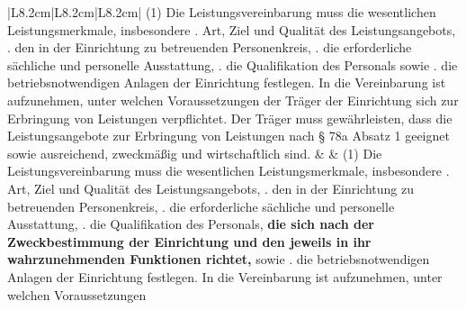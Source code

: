 \documentclass[10pt,a4paper,landscape]{article}
\begin{document}
\begin{longtable}{|L{8.2cm}|L{8.2cm}|L{8.2cm}|}
(1) Die Leistungsvereinbarung muss die  \newline wesentlichen Leistungsmerkmale,  \newline insbesondere   .   Art, Ziel und Qualität des  \newline Leistungsangebots,   . den in der Einrichtung zu betreuenden  \newline Personenkreis,   . die erforderliche sächliche und  \newline personelle Ausstattung,   . die Qualifikation des \textcolor{diffred}{Personals} sowie   . die betriebsnotwendigen Anlagen der  \newline Einrichtung   \newline festlegen. In die Vereinbarung ist  \newline aufzunehmen, unter welchen  \newline Voraussetzungen der Träger der  \newline Einrichtung sich zur Erbringung von  \newline Leistungen verpflichtet. Der Träger muss  \newline gewährleisten, dass die Leistungsangebote  \newline zur Erbringung von Leistungen nach \S{} 78a  \newline Absatz 1 geeignet sowie ausreichend,  \newline zweckmäßig und wirtschaftlich sind. &  & (1) Die Leistungsvereinbarung muss die  \newline wesentlichen Leistungsmerkmale,  \newline insbesondere   .   Art, Ziel und Qualität des  \newline Leistungsangebots,   . den in der Einrichtung zu betreuenden  \newline Personenkreis,   . die erforderliche sächliche und  \newline personelle Ausstattung,   . die Qualifikation des \textcolor{diffgreen}{Personals, }\textbf{\textcolor{diffgreen}{die sich  \newline nach der Zweckbestimmung der  \newline Einrichtung und den jeweils in ihr  \newline wahrzunehmenden Funktionen richtet,}}  \newline sowie   . die betriebsnotwendigen Anlagen der  \newline Einrichtung   \newline festlegen. In die Vereinbarung ist  \newline aufzunehmen, unter welchen  \newline Voraussetzungen 
\end{longtable}
\end{document}
